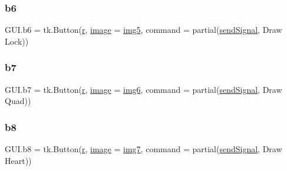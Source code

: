 \mbox{\label{namespace_g_u_i_a8b3fe1a314a7f97eb58e91a936f16d24}} 
\subsubsection{\texorpdfstring{b6}{b6}}
{\footnotesize\ttfamily G\+U\+I.\+b6 = tk.\+Button(\mbox{\hyperlink{_s_d_l__opengl_8h_a42ce7cdc612e53abee15043f80220d97}{r}}, \mbox{\hyperlink{_s_d_l__opengl_8h_a0a221b005894579fea3b9eb7bfc2ee71}{image}} = \mbox{\hyperlink{namespace_g_u_i_a3e9631bef05195054e18899712ee62e7}{img5}}, command = partial(\mbox{\hyperlink{namespace_g_u_i_ae82f740e6453cdd542b52ede1560c2c3}{send\+Signal}}, \textquotesingle{}Draw Lock\textquotesingle{}))}

\mbox{\label{namespace_g_u_i_a2b170b4727c7ee7938399888e449e39b}} 
\subsubsection{\texorpdfstring{b7}{b7}}
{\footnotesize\ttfamily G\+U\+I.\+b7 = tk.\+Button(\mbox{\hyperlink{_s_d_l__opengl_8h_a42ce7cdc612e53abee15043f80220d97}{r}}, \mbox{\hyperlink{_s_d_l__opengl_8h_a0a221b005894579fea3b9eb7bfc2ee71}{image}} = \mbox{\hyperlink{namespace_g_u_i_a6cb0dc882c4030753831044192cbef73}{img6}}, command = partial(\mbox{\hyperlink{namespace_g_u_i_ae82f740e6453cdd542b52ede1560c2c3}{send\+Signal}}, \textquotesingle{}Draw Quad\textquotesingle{}))}

\mbox{\label{namespace_g_u_i_a75a5a8fdd144311f4409de4a0dcfd143}} 
\subsubsection{\texorpdfstring{b8}{b8}}
{\footnotesize\ttfamily G\+U\+I.\+b8 = tk.\+Button(\mbox{\hyperlink{_s_d_l__opengl_8h_a42ce7cdc612e53abee15043f80220d97}{r}}, \mbox{\hyperlink{_s_d_l__opengl_8h_a0a221b005894579fea3b9eb7bfc2ee71}{image}} = \mbox{\hyperlink{namespace_g_u_i_ab8b458d392f9b3d983f3d09b8eadf226}{img7}}, command = partial(\mbox{\hyperlink{namespace_g_u_i_ae82f740e6453cdd542b52ede1560c2c3}{send\+Signal}}, \textquotesingle{}Draw Heart\textquotesingle{}))}

\mbox{\label{namespace_g_u_i_ad8ee1e3aaa566c9c531afb653646940f}} 
